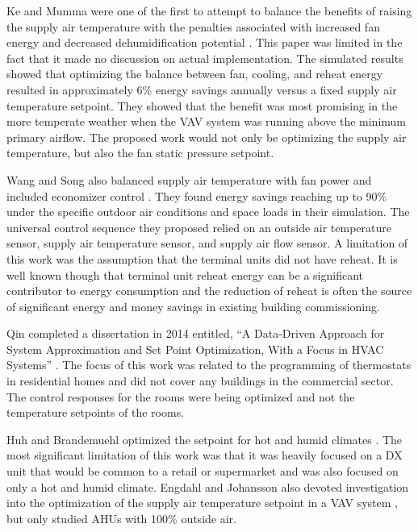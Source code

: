 Ke and Mumma were one of the first to attempt to balance the benefits of
raising the supply air temperature with the penalties associated with
increased fan energy and decreased dehumidification potential
\cite{Ke1997OptimizedSystems}. This paper was limited in the fact that
it made no discussion on actual implementation. The simulated results
showed that optimizing the balance between fan, cooling, and reheat
energy resulted in approximately 6\% energy savings annually versus a
fixed supply air temperature setpoint. They showed that the benefit was
most promising in the more temperate weather when the VAV system was
running above the minimum primary airflow. The proposed work would not only
be optimizing the supply air temperature, but also the fan static pressure setpoint.   

Wang and Song also balanced supply air temperature with fan power and
included economizer control \cite{Wang2012AirCycles}. They found energy
savings reaching up to 90\% under the specific outdoor air conditions
and space loads in their simulation. The universal control sequence they
proposed relied on an outside air temperature sensor, supply air
temperature sensor, and supply air flow sensor. A limitation of this
work was the assumption that the terminal units did not have reheat. It
is well known though that terminal unit reheat energy can be a
significant contributor to energy consumption and the reduction of
reheat is often the source of significant energy and money savings in
existing building commissioning.  

Qin completed a dissertation in 2014 entitled, ``A Data-Driven Approach
for System Approximation and Set Point Optimization, With a Focus in
HVAC Systems'' \cite{Qin_2014_Res_Letters}. The focus of this work was
related to the programming of thermostats in residential homes and did
not cover any buildings in the commercial sector. The control responses
for the rooms were being optimized and not the temperature setpoints of
the rooms.  

Huh and Brandemuehl optimized the setpoint for hot and humid climates
\cite{Huh2008}. The most significant limitation of this work was that it
was heavily focused on a DX unit that would be common to a retail or
supermarket and was also focused on only a hot and humid climate.
Engdahl and Johansson also devoted investigation into the optimization
of the supply air temperature setpoint in a VAV system
\cite{Engdahl2004}, but only studied AHUs with 100\% outside air. 

